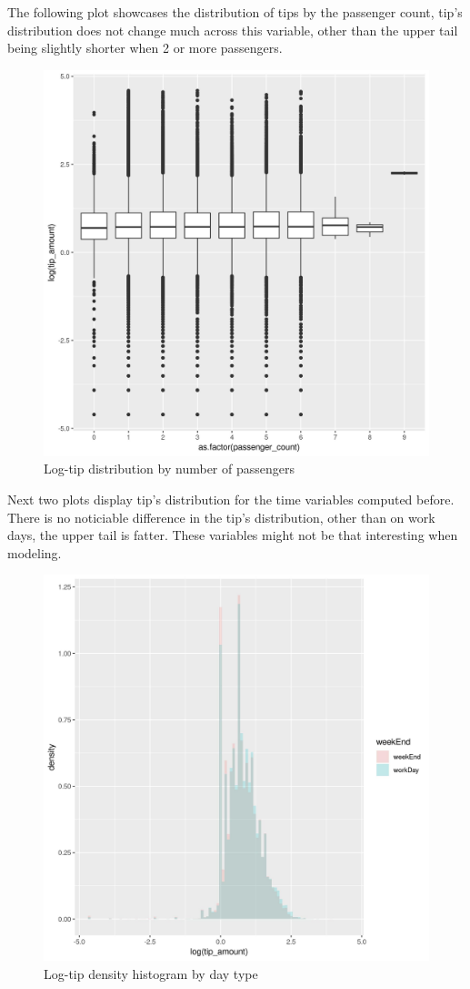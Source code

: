 \documentclass[11pt]{article}
\begin{document}
The following plot showcases the distribution of tips by the passenger
count, tip's distribution does not change much across this variable,
other than the upper tail being slightly shorter when 2 or more passengers.
\begin{figure}[htbp]
\centering
\includegraphics[width=.9\linewidth]{./plots/passengerTipBox.jpg}
\caption{\label{fig:org004926d}
Log-tip distribution by number of passengers}
\end{figure}


Next two plots display tip's distribution for the time variables computed
before. There is no noticiable difference in the tip's distribution,
other than on work days, the upper tail is fatter. These variables might
not be that interesting when modeling.
\begin{figure}[htbp]
\centering
\includegraphics[width=.9\linewidth]{./plots/weekendTipDensityHist.jpg}
\caption{\label{fig:org2dc1a4d}
Log-tip density histogram by day type}
\end{figure}
\end{document}

